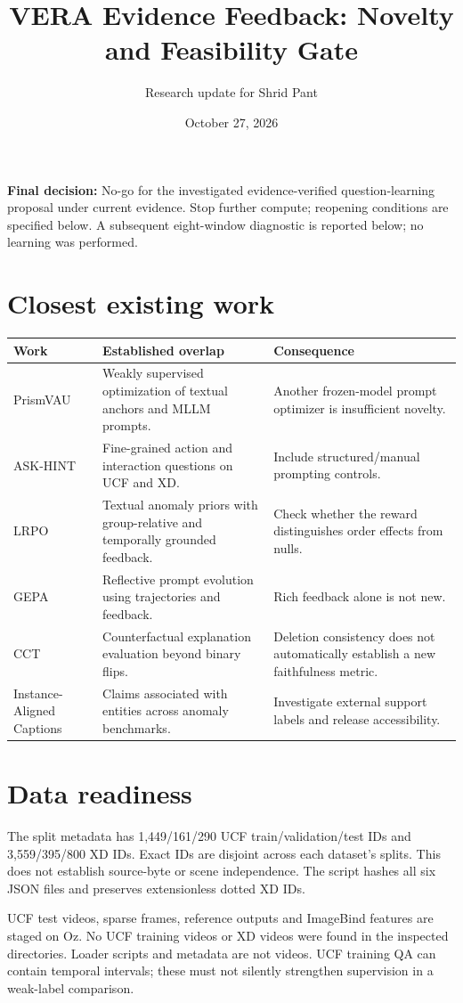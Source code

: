 \documentclass[11pt]{article}
\title{VERA Evidence Feedback: Novelty and Feasibility Gate}\author{Research update for Shrid Pant}\date{October 27, 2026}
\begin{document}
\maketitle
\textbf{Final decision:} No-go for the investigated evidence-verified question-learning proposal under current evidence. Stop further compute; reopening conditions are specified below. A subsequent eight-window diagnostic is reported below; no learning was performed.
\section{Closest existing work}
\begin{tabularx}{\linewidth}{lXX}\toprule Work & Established overlap & Consequence\\\midrule
PrismVAU & Weakly supervised optimization of textual anchors and MLLM prompts. & Another frozen-model prompt optimizer is insufficient novelty.\\
ASK-HINT & Fine-grained action and interaction questions on UCF and XD. & Include structured/manual prompting controls.\\
LRPO & Textual anomaly priors with group-relative and temporally grounded feedback. & Check whether the reward distinguishes order effects from nulls.\\
GEPA & Reflective prompt evolution using trajectories and feedback. & Rich feedback alone is not new.\\
CCT & Counterfactual explanation evaluation beyond binary flips. & Deletion consistency does not automatically establish a new faithfulness metric.\\
Instance-Aligned Captions & Claims associated with entities across anomaly benchmarks. & Investigate external support labels and release accessibility.\\\bottomrule\end{tabularx}
\section{Data readiness}
The split metadata has 1,449/161/290 UCF train/validation/test IDs and 3,559/395/800 XD IDs. Exact IDs are disjoint across each dataset's splits. This does not establish source-byte or scene independence. The script hashes all six JSON files and preserves extensionless dotted XD IDs.

UCF test videos, sparse frames, reference outputs and ImageBind features are staged on Oz. No UCF training videos or XD videos were found in the inspected directories. Loader scripts and metadata are not videos. UCF training QA can contain temporal intervals; these must not silently strengthen supervision in a weak-label comparison.
\end{document}
